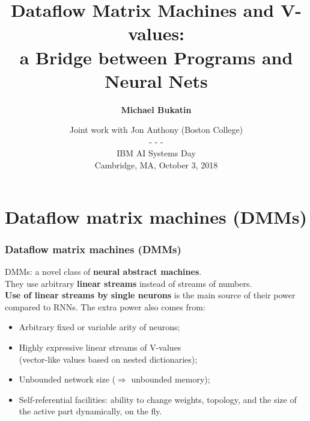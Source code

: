\documentclass{beamer}
\newcommand{\msmagenta}[1]{{\color{mymagenta} #1}}
\begin{document}
\title{Dataflow Matrix Machines and V-values:\\ a Bridge between Programs and Neural Nets}
\author{\bf Michael Bukatin}
\date[]  
{\small Joint work with Jon Anthony (Boston College)\\
 - - -\\
{IBM AI Systems Day\\
Cambridge, MA, October 3, 2018}}

\begin{frame}
  \titlepage
\end{frame}

\section{Dataflow matrix machines (DMMs)}

\begin{frame}

  \frametitle{\msmagenta{Dataflow matrix machines (DMMs)}}

DMMs: a novel class of {\bf neural abstract machines}.\\[2ex]

They use arbitrary {\bf linear streams} instead of streams of numbers.\\[2ex]

{\bf Use of linear streams by single neurons} is the main source of their power compared to RNNs.
The extra power also comes from:\\[1ex]

\begin{itemize}

\item Arbitrary fixed or variable arity of neurons;\\[2ex]

\item Highly expressive linear streams of V-values\\ (vector-like values based on nested dictionaries);\\[2ex]

\item Unbounded network size ($\Rightarrow$ unbounded memory);\\[2ex]

\item Self-referential facilities: ability to change weights, topology, and the size of the active part dynamically, on the fly.

\end{itemize}

\end{frame}
\end{document}
